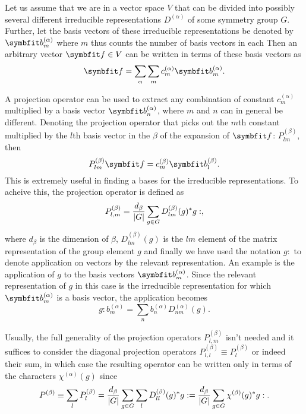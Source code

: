 Let us assume that we are in a vector space $V$ that can be divided into possibly several different irreducible representations $D^{(\alpha)}$ of some
symmetry group $G$. Further, let the basis vectors of these irreducible representations be denoted by $\v{b}^{(\alpha)}_m$ where $m$ thus counts the number
of basis vectors in each \irr Then an arbitrary vector $\v{f}\in V$ can be written in terms of these basis vectors as
\begin{equation}
    \label{eq:Group:Irr:Pro:basisDecomp}
    \v{f} = \sum_\alpha\sum_m c_m^{(\alpha)}\v{b}^{(\alpha)}_m.
\end{equation}

A projection operator can be used to extract any combination of constant $c_m^{(\alpha)}$ multiplied by a basis vector $\v{b}^{(\alpha)}_n$, where
$m$ and $n$ can in general be different. Denoting the projection operator that picks out the $m$th constant multiplied by the $l$th basis vector
in the \irr $\beta$ of the expansion of $\v{f}$: $P^{(\beta)}_{lm}$, then
\begin{equation}
    \label{eq:Group:Irr:Pro:generalProApplication}
    P^{(\beta)}_{lm}\v{f} = c_m^{(\beta)}\v{b}_l^{(\beta)}.
\end{equation}
This is extremely useful in finding a bases for the irreducible representations.
To acheive this, the projection operator is defined as
\begin{equation}
    \label{eq:Group:Irr:Pro:proOpDef}
    P^{(\beta)}_{l,m} = \frac{d_\beta}{\lvert G \rvert}\sum_{g\in G}D_{lm}^{(\beta)}(g)^\ast g:,
\end{equation}
where $d_\beta$ is the dimension of \irr $\beta$, $D_{lm}^{(\beta)}(g)$ is the $lm$ element of the matrix representation of the group element $g$ and
finally we have used the notation $g:$ to denote application on vectors by the relevant representation. An example is the application of $g$ to the
basis vectors $\v{b}_m^{(\alpha)}$. Since the relevant representation of $g$ in this case is the irreducible representation for which $\v{b}_m^{(\alpha)}$ is
a basis vector, the application becomes
\begin{equation}
    \label{eq:Group:Irr:Pro:gApplication}
    g : b_m^{(\alpha)} = \sum_nb_n^{(\alpha)}D_{nm}^{(\alpha)}(g).
\end{equation}

Usually, the full generality of the
projection operators $P^{(\beta)}_{l,m}$ isn't needed and it suffices to consider the diagonal projection operators
$P^{(\beta)}_{l,l} \equiv P^{(\beta)}_l$ or indeed their sum, in which case the resulting operator can be written only in terms of the \irr characters
$\chi^{(\alpha)}(g)$ since
\begin{equation}
    \label{eq:Group:Irr:Pro:charPro}
    P^{(\beta)}\equiv\sum_lP^{(\beta)}_l = \frac{d_\beta}{\lvert G \rvert}\sum_{g\in G}\sum_lD_{ll}^{(\beta)}(g)^\ast g: = \frac{d_\beta}{\lvert G \rvert}\sum_{g\in G}\chi^{(\beta)}(g)^\ast g:.
\end{equation}


